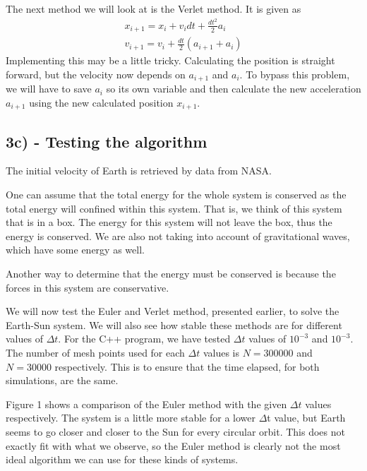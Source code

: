 \documentclass[12pt]{article}
\begin{document}
The next method we will look at is the Verlet method. It is given as
\begin{align*}
x_{i+1} = x_i + v_idt + \frac{dt^2}{2}a_i\\
v_{i+1} = v_i + \frac{dt}{2}\left(a_{i+1} + a_i \right)
\end{align*}
Implementing this may be a little tricky. Calculating the position is straight forward, but the velocity now depends on $a_{i+1}$ and $a_i$. To bypass this problem, we will have to save $a_i$ so its own variable and then calculate the new acceleration $a_{i+1}$ using the new calculated position $x_{i+1}$. 

\subsection*{3c) - Testing the algorithm}
The initial velocity of Earth is retrieved by data from NASA.

One can assume that the total energy for the whole system is conserved as the total energy will confined within this system. That is, we think of this system that is in a box. The energy for this system will not leave the box, thus the energy is conserved. We are also not taking into account of gravitational waves, which have some energy as well.

Another way to determine that the energy must be conserved is because the forces in this system are conservative.


We will now test the Euler and Verlet method, presented earlier, to solve the Earth-Sun system. We will also see how stable these methods are for different values of $\Delta t$. For the C++ program, we have tested $\Delta t$ values of $10^{-3}$ and $10^{-3}$. The number of mesh points used for each $\Delta t$ values is $N = 300 000$ and $N=30 000$ respectively. This is to ensure that the time elapsed, for both simulations, are the same.

Figure 1 shows a comparison of the Euler method with the given $\Delta t$ values respectively. The system is a little more stable for a lower $\Delta $t value, but Earth seems to go closer and closer to the Sun for every circular orbit. This does not exactly fit with what we observe, so the Euler method is clearly not the most ideal algorithm we can use for these kinds of systems.
\end{document}
